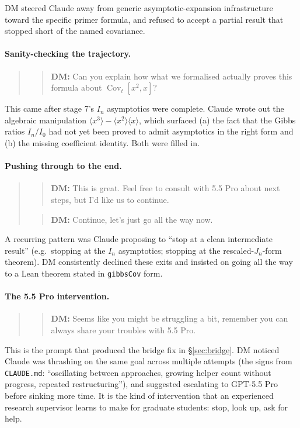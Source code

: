 \documentclass[11pt]{article}
\newcommand{\userbox}[1]{\par\medskip\begin{quote}\small\textbf{\textcolor{blue!60}{DM:}} #1\end{quote}\medskip}
\begin{document}
DM steered Claude away from generic asymptotic-expansion infrastructure
toward the specific primer formula, and refused to accept a partial
result that stopped short of the named covariance.

\paragraph{Sanity-checking the trajectory.}
\begin{quote}
\itshape
\userbox{Can you explain how what we formalised actually proves this
formula about $\operatorname{Cov}_t[x^2,x]$?}
\end{quote}

This came after stage 7's $I_n$ asymptotics were complete. Claude wrote
out the algebraic manipulation $\langle x^3\rangle - \langle x^2\rangle
\langle x\rangle$, which surfaced (a) the fact that the Gibbs ratios
$I_n/I_0$ had not yet been proved to admit asymptotics in the right form
and (b) the missing coefficient identity. Both were filled in.

\paragraph{Pushing through to the end.}
\begin{quote}
\itshape
\userbox{This is great. Feel free to consult with 5.5 Pro about next
steps, but I'd like us to continue.}

\userbox{Continue, let's just go all the way now.}
\end{quote}

A recurring pattern was Claude proposing to ``stop at a clean
intermediate result'' (e.g.\ stopping at the $I_n$ asymptotics; stopping
at the rescaled-$J_n$-form theorem). DM consistently declined these
exits and insisted on going all the way to a Lean theorem stated in
\texttt{gibbsCov} form.

\paragraph{The 5.5 Pro intervention.}
\begin{quote}
\itshape
\userbox{Seems like you might be struggling a bit, remember you can
always share your troubles with 5.5 Pro.}
\end{quote}

This is the prompt that produced the bridge fix in \S\ref{sec:bridge}.
DM noticed Claude was thrashing on the same goal across multiple
attempts (the signs from \texttt{CLAUDE.md}: ``oscillating between
approaches, growing helper count without progress, repeated
restructuring''), and suggested escalating to GPT-5.5 Pro before sinking
more time. It is the kind of intervention that an experienced research
supervisor learns to make for graduate students: stop, look up, ask for
help.
\end{document}
